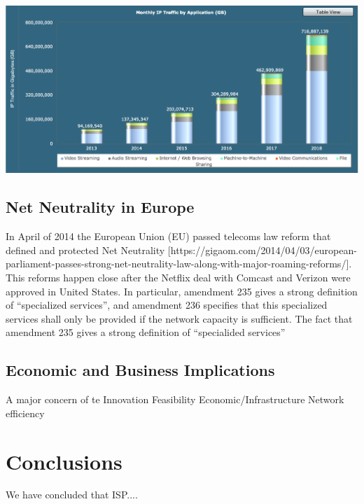 \documentclass{sigcomm-alternate}
\begin{document}
\hspace*{-0.6cm}
\includegraphics[scale=.29]{BandwidthGraph.png}


\subsection{Net Neutrality in Europe}

In April of 2014 the European Union (EU) passed telecoms law reform that defined and protected Net Neutrality [https://gigaom.com/2014/04/03/european-parliament-passes-strong-net-neutrality-law-along-with-major-roaming-reforms/]. This reforms happen close after the Netflix deal with Comcast and Verizon were approved in United States. In particular, amendment 235 gives a strong definition of “specialized services”, and amendment 236 specifies that this specialized services shall only be provided if the network capacity is sufficient. The fact that amendment 235 gives a strong definition of “specialided services” 


\subsection{Economic and Business Implications}
A major concern of te
Innovation
Feasibility
Economic/Infrastructure
Network efficiency



\section{Conclusions}
We have concluded that ISP....





\end{document}
